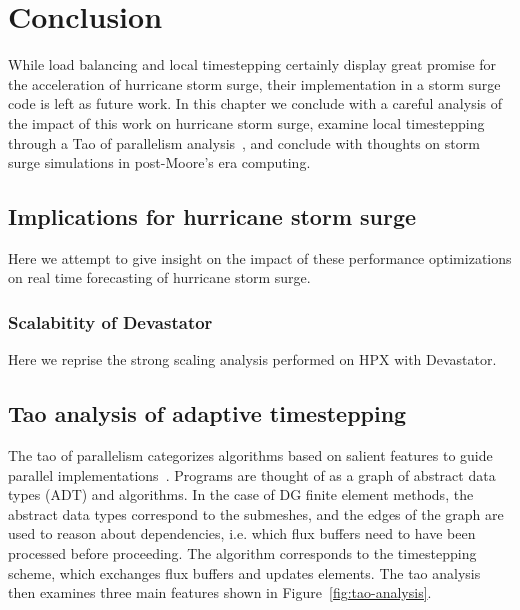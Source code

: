\chapter{Conclusion}

While load balancing and local timestepping certainly display great promise for the acceleration of hurricane storm surge, their implementation in a storm surge code is left as future work. In this chapter we conclude with a careful analysis of the impact of this work on hurricane storm surge, examine local timestepping through a Tao of parallelism analysis~\cite{Pingali2011}, and conclude with thoughts on storm surge simulations in post-Moore's era computing.

\section{Implications for hurricane storm surge}
Here we attempt to give insight on the impact of these performance optimizations on real time forecasting of hurricane storm surge.

\subsection{Scalabitity of Devastator}
Here we reprise the strong scaling analysis performed on HPX with Devastator. %


\section{Tao analysis of adaptive timestepping}
The tao of parallelism categorizes algorithms based on salient features to guide parallel implementations~\cite{Pingali2011}. Programs are thought of as a graph of abstract data types (ADT) and algorithms. In the case of DG finite element methods, the abstract data types correspond to the submeshes, and the edges of the graph are used to reason about dependencies, i.e. which flux buffers need to have been processed before proceeding. The algorithm corresponds to the timestepping scheme, which exchanges flux buffers and updates elements.
The tao analysis then examines three main features shown in Figure~\ref{fig:tao-analysis}.

